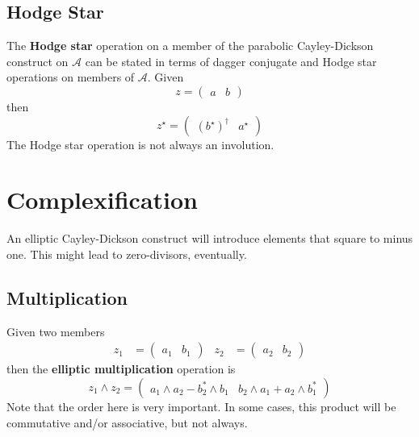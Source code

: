 \subsection{Hodge Star}
The \textbf{Hodge star} operation on a member of the parabolic Cayley-Dickson construct on $\mathcal{A}$ can be stated in terms of dagger conjugate and Hodge star operations on members of $\mathcal{A}$. Given
\begin{equation}
    z = \begin{pmatrix}
        a & b
    \end{pmatrix}
\end{equation}
then
\begin{equation}
     z^{\star} = \begin{pmatrix}
         (b^{\star})^{\dagger} &  a^{\star}
    \end{pmatrix}
\end{equation}
The Hodge star operation is not always an involution.
\section{Complexification}
An elliptic Cayley-Dickson construct will introduce elements that square to minus one. This might lead to zero-divisors, eventually.
\subsection{Multiplication}
Given two members
\begin{align*}
    z_{1} &= \begin{pmatrix}
        a_{1} & b_{1}
    \end{pmatrix} &
    z_{2} &= \begin{pmatrix}
        a_{2} & b_{2}
    \end{pmatrix}
\end{align*}
then the \textbf{elliptic multiplication} operation is
\begin{equation}
    z_{1} \wedge z_{2} = \begin{pmatrix}
        a_{1} \wedge a_{2} - b_{2}^{\ast} \wedge b_{1} & b_{2} \wedge a_{1} + a_{2} \wedge b_{1}^{\ast}
    \end{pmatrix}
\end{equation}
Note that the order here is very important. In some cases, this product will be commutative and/or associative, but not always.
